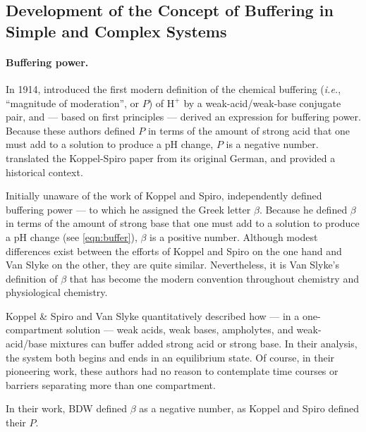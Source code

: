 \documentclass[fleqn,10pt]{physiome}
\begin{document}
\subsection{Development of the Concept of Buffering in Simple and Complex Systems}

\paragraph{Buffering power.} 
In 1914, \cite{koppel1914wirkung} introduced the first modern definition of the chemical buffering (\emph{i.e.}, ``magnitude of moderation'', or $P$) of $\mathrm{H^+}$ by a weak-acid/weak-base conjugate pair, and --- based on first principles --- derived an expression for buffering power. Because these authors defined $P$ in terms of the amount of strong acid that one must add to a solution to produce a $\mathrm{pH}$ change, $P$ is a negative number. \cite{roos1980buffer} translated the Koppel-Spiro paper from its original German, and provided a historical context.

Initially unaware of the work of Koppel and Spiro, \cite{van1922measurement} independently defined buffering power --- to which he assigned the Greek letter $\beta$. Because he defined $\beta$ in terms of the amount of strong base that one must add to a solution to produce a $\mathrm{pH}$ change (see \autoref{eqn:buffer}), $\beta$ is a positive number. Although modest differences exist between the efforts of Koppel and Spiro on the one hand and Van Slyke on the other, they are quite similar. Nevertheless, it is Van Slyke's definition of $\beta$ that has become the modern convention throughout chemistry and physiological chemistry.

Koppel \& Spiro and Van Slyke quantitatively described how --- in a one-compartment solution --- weak acids, weak bases, ampholytes, and weak-acid/base mixtures can buffer added strong acid or strong base. In their analysis, the system both begins and ends in an equilibrium state. Of course, in their pioneering work, these authors had no reason to contemplate time courses or barriers separating more than one compartment.

In their work, BDW defined $\beta$ as a negative number, as Koppel and Spiro defined their $P$.
\end{document}
